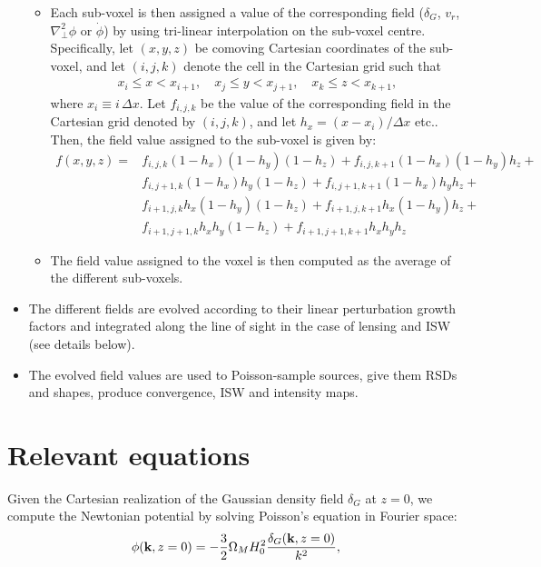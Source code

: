 \documentclass[a4paper,10pt]{article}
\begin{document}
\begin{itemize}
\begin{itemize}
        \item Each sub-voxel is then assigned a value of the corresponding field
          ($\delta_G$, $v_r$, $\nabla^2_\perp\phi$ or $\dot{\phi}$) by using
          tri-linear interpolation on the sub-voxel centre. Specifically, let
          $(x,y,z)$ be comoving Cartesian coordinates of the sub-voxel, and let
          $(i,j,k)$ denote the cell in the Cartesian grid such that
          \begin{align}
            x_i\leq x<x_{i+1},\hspace{12pt}x_j\leq y<x_{j+1},\hspace{12pt}
            x_k\leq z<x_{k+1},
          \end{align}
          where $x_i\equiv i\,\Delta x$. Let $f_{i,j,k}$ be the value of the
          corresponding field in the Cartesian grid denoted by $(i,j,k)$, and
          let $h_x=(x-x_i)/\Delta x$ etc.. Then, the field value assigned to the sub-voxel
          is given by:
          \begin{align}
            f(x,y,z)=&
            f_{i,j,k}(1-h_x)(1-h_y)(1-h_z)+
            f_{i,j,k+1}(1-h_x)(1-h_y)h_z+\\
            &f_{i,j+1,k}(1-h_x)h_y(1-h_z)+
            f_{i,j+1,k+1}(1-h_x)h_yh_z+\\
            &f_{i+1,j,k}h_x(1-h_y)(1-h_z)+
            f_{i+1,j,k+1}h_x(1-h_y)h_z+\\
            &f_{i+1,j+1,k}h_xh_y(1-h_z)+
            f_{i+1,j+1,k+1}h_xh_yh_z
          \end{align}
        \item The field value assigned to the voxel is then computed as the average
          of the different sub-voxels.
      \end{itemize}
    \item The different fields are evolved according to their linear perturbation growth
      factors and integrated along the line of sight in the case of lensing and ISW (see 
      details below).
    \item The evolved field values are used to Poisson-sample sources, give them RSDs
      and shapes, produce convergence, ISW and intensity maps.
  \end{itemize}

\section{Relevant equations}
  Given the Cartesian realization of the Gaussian density field $\delta_G$ at $z=0$,
  we compute the Newtonian potential by solving Poisson's equation in Fourier space:
  \begin{equation}
    \phi({\bf k},z=0)=-\frac{3}{2}\Omega_MH_0^2\frac{\delta_G({\bf k},z=0)}{k^2},
  \end{equation}
\end{document}
